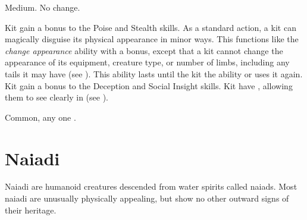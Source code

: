    Medium.
   No change.
  \begin{raggeditemize}
     Kit gain a  bonus to the Poise and Stealth skills.
     As a standard action, a kit can magically disguise its physical appearance in minor ways.
      This functions like the \textit{change appearance} ability with a  bonus, except that a kit cannot change the appearance of its equipment, creature type, or number of limbs, including any tails it may have (see ).
      This ability lasts until the kit  the ability or uses it again.
     Kit gain a  bonus to the Deception and Social Insight skills.
     Kit have , allowing them to see clearly in  (see ).
  \end{raggeditemize}
   Common, any one .

\section{Naiadi}\label{Naiadi}
  Naiadi are humanoid creatures descended from water spirits called naiads.
  Most naiadi are unusually physically appealing, but show no other outward signs of their heritage.

